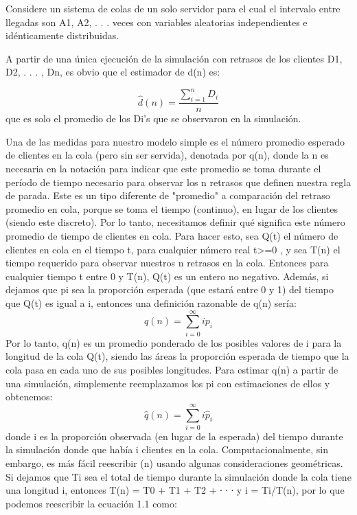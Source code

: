 Considere un sistema de colas de un solo servidor para el cual el intervalo entre llegadas son A1, A2, . . . veces con
variables aleatorias independientes e idénticamente distribuidas.

A partir de una única ejecución de la simulación con retrasos de los clientes D1, D2, . . . , Dn, es obvio que el
estimador de d(n) es:

\begin{equation} \label{eq:equation}
\hat{d}(n) = \frac{\sum_{i = 1}^{n}D_{i}}{n}
\end{equation}
que es solo el promedio de los Di's que se observaron en la simulación.

Una de las medidas para nuestro modelo simple es el número promedio esperado de clientes en la cola (pero sin
ser servida), denotada por q(n), donde la n es necesaria en la notación para indicar que este promedio se
toma durante el período de tiempo necesario para observar los n retrasos que definen
nuestra regla de parada.
Este es un tipo diferente de "promedio" a comparación del retraso promedio en cola, porque se toma el tiempo
(continuo), en lugar de los clientes (siendo este discreto).
Por lo tanto, necesitamos definir qué significa este número promedio de tiempo de
clientes en cola.
Para hacer esto, sea Q(t) el número de clientes en cola en el tiempo t, para cualquier número real t>=0 ,
y sea T(n) el tiempo requerido para observar nuestros n retrasos en la cola.
Entonces para cualquier tiempo t entre 0 y T(n), Q(t) es un entero no negativo. Además, si dejamos que pi sea la
proporción esperada (que estará entre 0 y 1) del tiempo que Q(t) es igual a i, entonces una definición
razonable de q(n) sería:
 \begin{equation}
   \label{eq:equation2}
q(n) = \sum_{i=0}^{\infty}ip_{i}
 \end{equation}
Por lo tanto, q(n) es un promedio ponderado de los posibles valores de i para la longitud de la cola Q(t),
siendo las áreas la proporción esperada de tiempo que la cola pasa en cada uno de sus posibles longitudes.
Para estimar q(n) a partir de una simulación, simplemente reemplazamos los pi con estimaciones de ellos y
obtenemos:
\begin{equation}
  \label{eq:equation3}
  \hat{q}(n) = \sum_{i=0}^{\infty}i\hat{p}_{i}
\end{equation}
donde i es la proporción observada (en lugar de la esperada) del tiempo durante la simulación
donde que había i clientes en la cola.
Computacionalmente, sin embargo, es más fácil reescribir (n) usando algunas consideraciones geométricas.
Si dejamos que Ti sea el total de tiempo durante la simulación donde la cola tiene una longitud i, entonces
T(n) = T0 + T1 + T2 + ∙ ∙ ∙ y i = Ti/T(n), por lo que podemos reescribir la ecuación 1.1 como:


